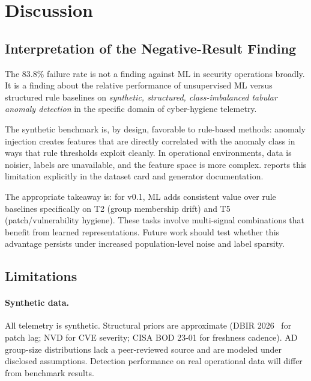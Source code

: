 
\section{Discussion}
\label{sec:discussion}

\subsection{Interpretation of the Negative-Result Finding}

The 83.8\% failure rate is not a finding against ML in security operations broadly.
It is a finding about the relative performance of unsupervised ML versus structured
rule baselines on \emph{synthetic, structured, class-imbalanced tabular anomaly
detection} in the specific domain of cyber-hygiene telemetry.

The synthetic benchmark is, by design, favorable to rule-based methods: anomaly
injection creates features that are directly correlated with the anomaly class in
ways that rule thresholds exploit cleanly. In operational environments, data is
noisier, labels are unavailable, and the feature space is more complex.
\hygienebench reports this limitation explicitly in the dataset card and generator
documentation.

The appropriate takeaway is: for \hygienebench v0.1, ML adds consistent value over
rule baselines specifically on T2 (group membership drift) and T5
(patch/vulnerability hygiene). These tasks involve multi-signal combinations that
benefit from learned representations. Future work should test whether this advantage
persists under increased population-level noise and label sparsity.

\subsection{Limitations}

\paragraph{Synthetic data.}
All telemetry is synthetic. Structural priors are approximate (DBIR
2026~\cite{verizon_dbir_2026} for patch
lag; NVD for CVE severity; CISA BOD 23-01 for freshness cadence). AD group-size
distributions lack a peer-reviewed source and are modeled under disclosed
assumptions. Detection performance on real operational data will differ from
benchmark results.

